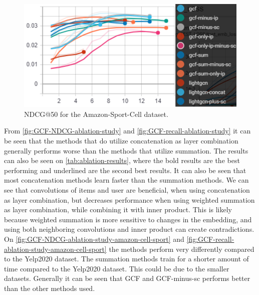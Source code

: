 \begin{figure}[h!]
    \includegraphics[width=\linewidth]{figures/amazon-cell-sport-gcf-all-ndcg.png}
    \caption{NDCG@50 for the Amazon-Sport-Cell dataset.}
    \label{fig:GCF-NDCG-ablation-study-amazon-cell-sport}
\end{figure}
From \autoref{fig:GCF-NDCG-ablation-study} and \autoref{fig:GCF-recall-ablation-study} it can be seen that the methods that do utilize concatenation as layer combination generally performs worse than the methods that utilize summation.
The results can also be seen on \autoref{tab:ablation-results}, where the bold results are the best performing and underlined are the second best results.
It can also be seen that most concatenation methods learn faster than the summation methods.
We can see that convolutions of items and user are beneficial, when using concatenation as layer combination, but decreases performance when using weighted summation as layer combination, while combining it with inner product.
This is likely because weighted summation is more sensitive to changes in the embedding, and using both neighboring convolutions and inner product can create contradictions.
On \autoref{fig:GCF-NDCG-ablation-study-amazon-cell-sport} and \autoref{fig:GCF-recall-ablation-study-amazon-cell-sport} the methods perform very differently compared to the Yelp2020 dataset.
The summation methods train for a shorter amount of time compared to the Yelp2020 dataset.
This could be due to the smaller datasets.
Generally it can be seen that GCF and GCF-minus-sc performs better than the other methods used.
